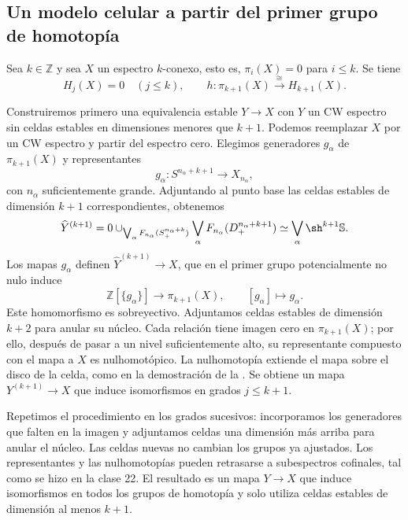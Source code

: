 \subsection{Un modelo celular a partir del primer grupo de homotopía}
\begin{teo}\label{teo:c23-hurewicz}
Sea $k\in\mathbb Z$ y sea $X$ un espectro $k$-conexo, esto es, $\pi_i(X)=0$ para $i\leq k$. Se tiene
\[
H_j(X)=0\quad(j\leq k),
\qquad
h\colon\pi_{k+1}(X)\xrightarrow{\cong}H_{k+1}(X).
\]
\end{teo}

Construiremos primero una equivalencia estable $Y\to X$ con $Y$ un CW espectro sin celdas estables en dimensiones menores que $k+1$. Podemos reemplazar $X$ por un CW espectro y partir del espectro cero. Elegimos generadores $g_\alpha$ de $\pi_{k+1}(X)$ y representantes
\[
g_\alpha\colon S^{n_\alpha+k+1}\longrightarrow X_{n_\alpha},
\]
con $n_\alpha$ suficientemente grande. Adjuntando al punto base las celdas estables de dimensión $k+1$ correspondientes, obtenemos
\[
\widehat Y^{(k+1)}
=0\cup_{\bigvee_\alpha F_{n_\alpha}(S^{n_\alpha+k}_+)}
\bigvee_\alpha F_{n_\alpha}(D^{n_\alpha+k+1}_+)
\simeq\bigvee_\alpha\sh^{k+1}\mathbb S.
\]
Los mapas $g_\alpha$ definen $\widehat Y^{(k+1)}\to X$, que en el primer grupo potencialmente no nulo induce
\[
\mathbb Z[\{g_\alpha\}]\longrightarrow\pi_{k+1}(X),
\qquad [g_\alpha]\longmapsto g_\alpha.
\]
Este homomorfismo es sobreyectivo. Adjuntamos celdas estables de dimensión $k+2$ para anular su núcleo. Cada relación tiene imagen cero en $\pi_{k+1}(X)$; por ello, después de pasar a un nivel suficientemente alto, su representante compuesto con el mapa a $X$ es nulhomotópico. La nulhomotopía extiende el mapa sobre el disco de la celda, como en la demostración de la . Se obtiene un mapa $Y^{(k+1)}\to X$ que induce isomorfismos en grados $j\leq k+1$.

Repetimos el procedimiento en los grados sucesivos: incorporamos los generadores que falten en la imagen y adjuntamos celdas una dimensión más arriba para anular el núcleo. Las celdas nuevas no cambian los grupos ya ajustados. Los representantes y las nulhomotopías pueden retrasarse a subespectros cofinales, tal como se hizo en la clase 22. El resultado es un mapa $Y\to X$ que induce isomorfismos en todos los grupos de homotopía y solo utiliza celdas estables de dimensión al menos $k+1$.

